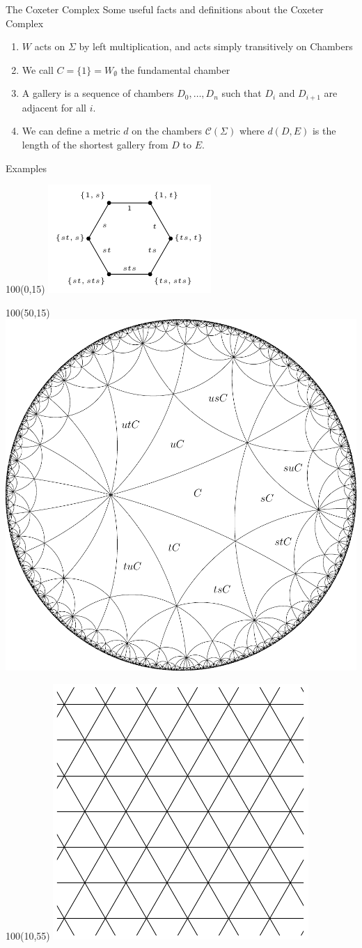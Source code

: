\documentclass[xcolor=dvipsnames]{beamer}
\theoremstyle{definition}
\begin{document}
\begin{frame}{The Coxeter Complex}
	Some useful facts and definitions about the Coxeter Complex
\begin{enumerate}
	\pause
\item $W$ acts on $\Sigma$ by left multiplication, and acts simply transitively on Chambers
	\pause
\item We call $C=\{1\}=W_{\emptyset}$ the fundamental chamber
	\pause
\item A gallery is a sequence of chambers $D_0,\dots,D_n$ such that $D_i$ and $D_{i+1}$ are adjacent for all $i.$
	\pause
\item We can define a metric $d$ on the chambers $\mathcal{C}(\Sigma)$ where $d(D,E)$ is the length of the shortest gallery from $D$ to $E.$
\end{enumerate}
\end{frame}

\begin{frame}{Examples}
	\begin{textblock}{100}(0,15)
		\includegraphics[width=2 in]{diagrams/hexagon.pdf}
	\end{textblock}
	\begin{textblock}{100}(50,15)
	\includegraphics[width=70 mm]{diagrams/hyp.pdf}
	\end{textblock}
	\begin{textblock}{100}(10,55)
	\includegraphics[width=1.33 in]{diagrams/affinetriangle.pdf}
	\end{textblock}
\end{frame}
\end{document}

